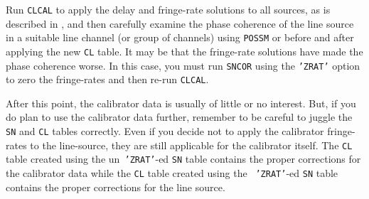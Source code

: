 Run {\tt CLCAL} to apply the delay and fringe-rate solutions to all
sources, as is described in , and then carefully examine
the phase coherence of the line source in a suitable line channel (or
group of channels) using {\tt POSSM} or {\tt {}} before and
after applying the new {\tt CL} table.  It may be that the fringe-rate
solutions have made the phase coherence worse.  In this case, you must
run {\tt SNCOR} using the {\tt 'ZRAT'} option to zero the fringe-rates
and then re-run {\tt CLCAL}\@.

After this point, the calibrator data is usually of little or no
interest.  But, if you do plan to use the calibrator data further,
remember to be careful to juggle the {\tt SN} and {\tt CL} tables
correctly.  Even if you decide not to apply the calibrator
fringe-rates to the line-source, they are still applicable for the
calibrator itself.  The {\tt CL} table created using the un{\tt
'ZRAT'}-ed {\tt SN} table contains the proper corrections for the
calibrator data while the {\tt CL} table created using the {\tt
'ZRAT'}-ed {\tt SN} table contains the proper corrections for the
line source.

